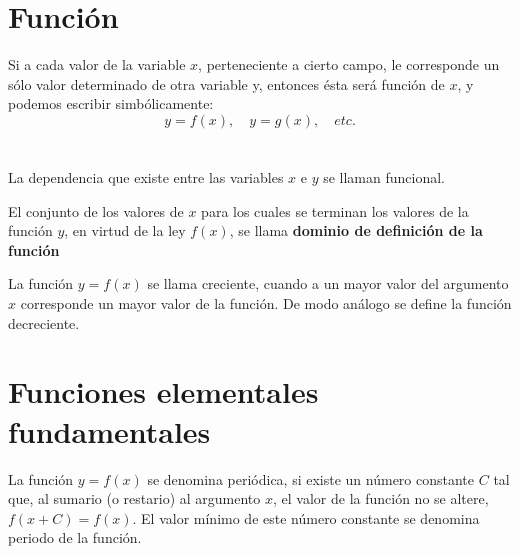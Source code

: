 \section{Función}

    \begin{tcolorbox}[colframe=white]
	\begin{def.}
	    Si a cada valor de la variable $x$, perteneciente a cierto campo, le corresponde un sólo valor determinado de otra variable y, entonces ésta será función de $x$, y podemos escribir simbólicamente: $$y=f(x), \quad y = g(x), \quad etc.$$\\\\
	    La dependencia que existe entre las variables $x$ e $y$ se llaman funcional.\\
	\end{def.}
    \end{tcolorbox}

    \begin{tcolorbox}[colframe=white]
	\begin{def.}
	    El conjunto de los valores de $x$ para los cuales se terminan los valores de la función $y$, en virtud de la ley $f(x)$, se llama \textbf{dominio de definición de la función}\\
	\end{def.}
    \end{tcolorbox}

    \begin{tcolorbox}[colframe = white]
	\begin{def.}
	    La función $y=f(x)$ se llama creciente, cuando a un mayor valor del argumento $x$ corresponde un mayor valor de la función. De modo análogo se define la función decreciente.\\
	\end{def.}
    \end{tcolorbox}

\setcounter{section}{7}
\section{Funciones elementales fundamentales}

    \begin{tcolorbox}[colframe = white]
	\begin{def.}
	    La función $y=f(x)$ se denomina periódica, si existe un número constante $C$ tal que, al sumario (o restario) al argumento $x$, el valor de la función no se altere, $f(x+C) = f(x)$. El valor mínimo de este número constante  se denomina periodo de la función.\\ 
	\end{def.}
    \end{tcolorbox}

